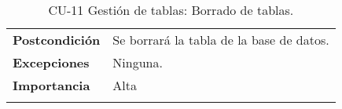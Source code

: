 \begin{longtable}[H]{@{}ll@{}}
\begin{minipage}[t]{0.23\columnwidth}
\textbf{Postcondición}\strut
\end{minipage} & \begin{minipage}[t]{0.71\columnwidth}\raggedright\strut
Se borrará la tabla de la base de datos.\strut
\end{minipage}\tabularnewline
\begin{minipage}[t]{0.23\columnwidth}\raggedright\strut
\textbf{Excepciones}\strut
\end{minipage} & \begin{minipage}[t]{0.71\columnwidth}\raggedright\strut
Ninguna. \strut
\end{minipage}\tabularnewline
\begin{minipage}[t]{0.23\columnwidth}\raggedright\strut
\textbf{Importancia}\strut
\end{minipage} & \begin{minipage}[t]{0.71\columnwidth}\raggedright\strut
Alta\strut
\end{minipage}\tabularnewline
\bottomrule
\caption{CU-11 Gestión de tablas: Borrado de tablas.}
\end{longtable}

